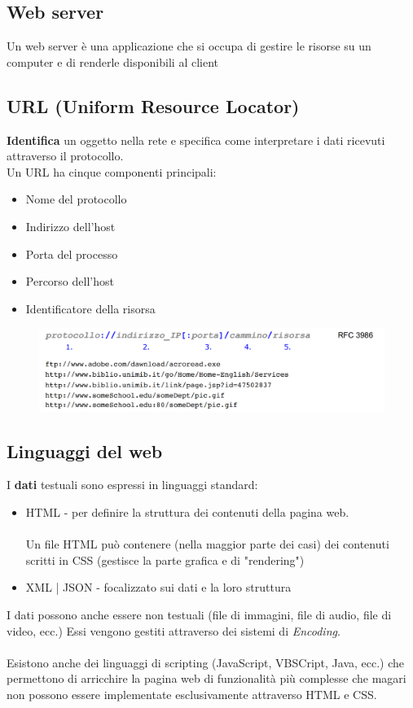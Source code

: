 \documentclass[12pt, a4paper]{article}
\begin{document}
    \subsection{Web server}
    Un web server è una applicazione che si occupa di gestire le risorse su un computer 
    e di renderle disponibili al client
    \newpage
    \subsection{URL (Uniform Resource Locator)}
    \textbf{Identifica} un oggetto nella rete e specifica come interpretare i dati ricevuti
    attraverso il protocollo.
    \\Un URL ha cinque componenti principali:
    \begin{itemize}
        \item Nome del protocollo
        \item Indirizzo dell'host
        \item Porta del processo
        \item Percorso dell'host
        \item Identificatore della risorsa
    \end{itemize}

    \begin{figure}[htbp]
        \centering
        \includegraphics[scale=0.5]{url.png}
    \end{figure}

    \subsection{Linguaggi del web}
    I \textbf{dati} testuali sono espressi in linguaggi standard:
    \begin{itemize}
        \item HTML - per definire la struttura dei contenuti della pagina web.
        \\\\Un file HTML può contenere (nella maggior parte dei casi) dei contenuti scritti
        in CSS (gestisce la parte grafica e di "rendering")
        \item XML | JSON - focalizzato sui dati e la loro struttura
    \end{itemize}
    I dati possono anche essere non testuali (file di immagini, file di audio, file di video, ecc.)
    Essi vengono gestiti attraverso dei sistemi di \textit{Encoding}.
    \\\\
    Esistono anche dei linguaggi di scripting (JavaScript, VBSCript, Java, ecc.) che permettono 
    di arricchire la pagina web di funzionalità più complesse che magari non possono essere implementate
    esclusivamente attraverso HTML e CSS.
\end{document}
